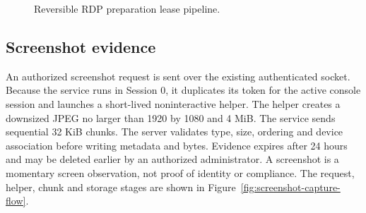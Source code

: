 \documentclass[12pt,a4paper]{report}
\begin{document}
\begin{figure}[H]
\centering
{}
\caption{Reversible RDP preparation lease pipeline.}
\label{fig:rdp-preparation-flow}
\end{figure}

\subsection{Screenshot evidence}
An authorized screenshot request is sent over the existing authenticated
socket. Because the service runs in Session 0, it duplicates its token for
the active console session and launches a short-lived noninteractive helper.
The helper creates a downsized JPEG no larger than 1920 by 1080 and 4 MiB.
The service sends sequential 32 KiB chunks. The server validates type, size,
ordering and device association before writing metadata and bytes. Evidence
expires after 24 hours and may be deleted earlier by an authorized
administrator. A screenshot is a momentary screen observation, not proof of
identity or compliance. The request, helper, chunk and storage stages are
shown in Figure~\ref{fig:screenshot-capture-flow}.
\end{document}
